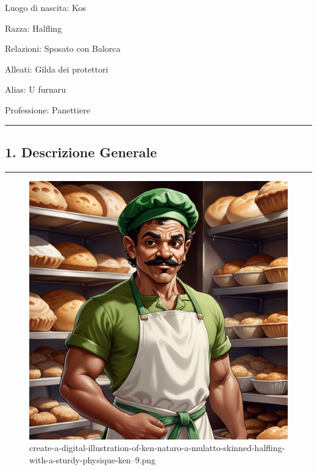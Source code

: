 Luogo di nascita: Kos

Razza: Halfling

Relazioni: Sposato con Balorca

Alleati: Gilda dei protettori

Alias: U furnaru

Professione: Panettiere

\begin{center}\rule{0.5\linewidth}{0.5pt}\end{center}

\subsection{1. Descrizione Generale}\label{descrizione-generale}

\begin{center}\rule{0.5\linewidth}{0.5pt}\end{center}

\begin{figure}
\centering
\includegraphics{create-a-digital-illustration-of-ken-nataro-a-mulatto-skinned-halfling-with-a-sturdy-physique-ken--9.png}
\caption{create-a-digital-illustration-of-ken-nataro-a-mulatto-skinned-halfling-with-a-sturdy-physique-ken--9.png}
\end{figure}

